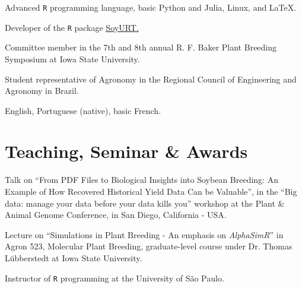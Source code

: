 \documentclass[]{mdkrause_cv_openfont}
\begin{document}
\begin{minipage}[t]{1\textwidth}
\sectionsep

\begin{tightemize}
	\item Advanced \texttt{R} programming language, basic Python and Julia, Linux, and \LaTeX.
	\item Developer of the \texttt{R} package \href{https://cran.r-project.org/web/packages/SoyURT/index.html}{SoyURT.} \ExternalLink
\end{tightemize}

\sectionsep

\begin{tightemize}
	\item {} Committee member in the 7th and 8th annual R. F. Baker Plant Breeding Symposium at Iowa State University.
	\item {} Student representative of Agronomy in the Regional Council of Engineering and Agronomy in Brazil.
\end{tightemize}

\sectionsep

English, Portuguese (native), basic French.

\sectionsep

\section{Teaching, Seminar \& Awards}

\sectionsep

\begin{tightemize}
	\item {} Talk on ``From PDF Files to Biological Insights into Soybean Breeding: An Example of How Recovered Historical Yield Data Can be Valuable'', in the ``Big data: manage your data before your data kills you'' workshop at the Plant \& Animal Genome Conference, in San Diego, California - USA.
	\item {} Lecture on ``Simulations in Plant Breeding - An emphasis on \emph{AlphaSimR}'' in Agron 523, Molecular Plant Breeding, graduate-level course under Dr. Thomas Lübberstedt at Iowa State University.
	\item {} Instructor of \texttt{R} programming at the University of São Paulo.
\end{tightemize}

\sectionsep


\end{minipage}
\end{document}
